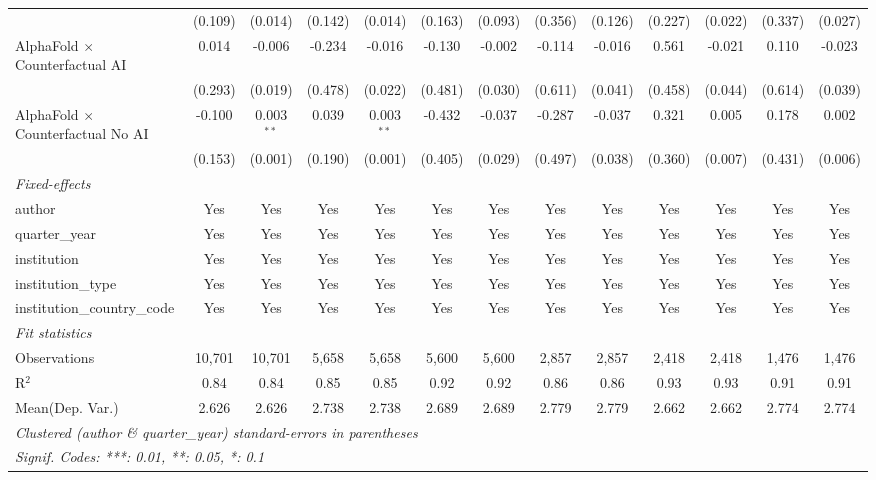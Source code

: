 \begin{tabular}{lcccccccccccc}
                                            & (0.109)      & (0.014)        & (0.142) & (0.014)       & (0.163) & (0.093) & (0.356) & (0.126) & (0.227) & (0.022) & (0.337) & (0.027)\\   
   AlphaFold $\times$ Counterfactual AI     & 0.014        & -0.006         & -0.234  & -0.016        & -0.130  & -0.002  & -0.114  & -0.016  & 0.561   & -0.021  & 0.110   & -0.023\\   
                                            & (0.293)      & (0.019)        & (0.478) & (0.022)       & (0.481) & (0.030) & (0.611) & (0.041) & (0.458) & (0.044) & (0.614) & (0.039)\\   
   AlphaFold $\times$ Counterfactual No AI  & -0.100       & 0.003$^{**}$   & 0.039   & 0.003$^{**}$  & -0.432  & -0.037  & -0.287  & -0.037  & 0.321   & 0.005   & 0.178   & 0.002\\   
                                            & (0.153)      & (0.001)        & (0.190) & (0.001)       & (0.405) & (0.029) & (0.497) & (0.038) & (0.360) & (0.007) & (0.431) & (0.006)\\   
   \midrule
   \emph{Fixed-effects}\\
   author                                   & Yes          & Yes            & Yes     & Yes           & Yes     & Yes     & Yes     & Yes     & Yes     & Yes     & Yes     & Yes\\  
   quarter\_year                            & Yes          & Yes            & Yes     & Yes           & Yes     & Yes     & Yes     & Yes     & Yes     & Yes     & Yes     & Yes\\  
   institution                              & Yes          & Yes            & Yes     & Yes           & Yes     & Yes     & Yes     & Yes     & Yes     & Yes     & Yes     & Yes\\  
   institution\_type                        & Yes          & Yes            & Yes     & Yes           & Yes     & Yes     & Yes     & Yes     & Yes     & Yes     & Yes     & Yes\\  
   institution\_country\_code               & Yes          & Yes            & Yes     & Yes           & Yes     & Yes     & Yes     & Yes     & Yes     & Yes     & Yes     & Yes\\  
   \midrule
   \emph{Fit statistics}\\
   Observations                             & 10,701       & 10,701         & 5,658   & 5,658         & 5,600   & 5,600   & 2,857   & 2,857   & 2,418   & 2,418   & 1,476   & 1,476\\  
   R$^2$                                    & 0.84         & 0.84           & 0.85    & 0.85          & 0.92    & 0.92    & 0.86    & 0.86    & 0.93    & 0.93    & 0.91    & 0.91\\  
Mean(Dep. Var.) & 2.626 & 2.626 & 2.738 & 2.738 & 2.689 & 2.689 & 2.779 & 2.779 & 2.662 & 2.662 & 2.774 & 2.774 \\
   \midrule \midrule
   \multicolumn{13}{l}{\emph{Clustered (author \& quarter\_year) standard-errors in parentheses}}\\
   \multicolumn{13}{l}{\emph{Signif. Codes: ***: 0.01, **: 0.05, *: 0.1}}\\
\end{tabular}
\par\endgroup
